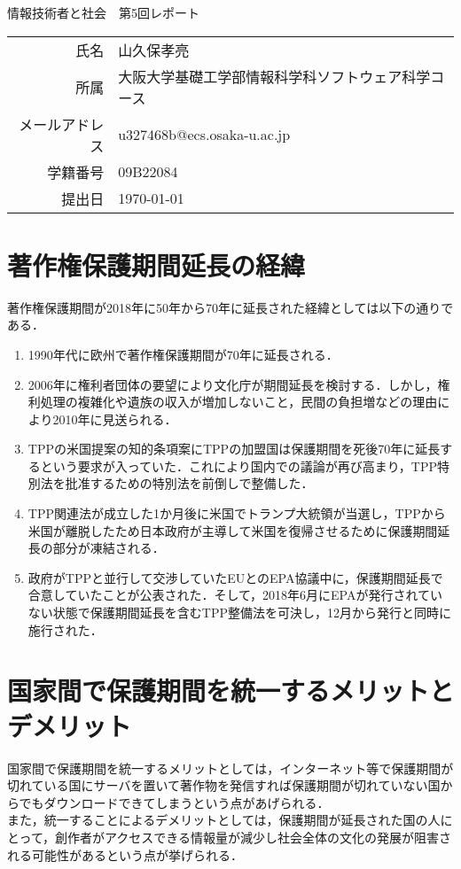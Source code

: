 \documentclass[dvipdfmx]{jarticle}
\begin{document}
\begin{titlepage}
    \begin{center}
        {\huge 情報技術者と社会　第5回レポート}
        \vspace{180pt}\\
        \begin{tabular}{rl}
            氏名 & 山久保孝亮\\
            所属 & 大阪大学基礎工学部情報科学科ソフトウェア科学コース\\
            メールアドレス & u327468b@ecs.osaka-u.ac.jp\\
            学籍番号 & 09B22084\\
            提出日 & \today\\
        \end{tabular}
    \end{center}
\end{titlepage}
\section{著作権保護期間延長の経緯}
著作権保護期間が2018年に50年から70年に延長された経緯としては以下の通りである．\cite{1}
\begin{enumerate}
    \item 1990年代に欧州で著作権保護期間が70年に延長される．
    \item 2006年に権利者団体の要望により文化庁が期間延長を検討する．しかし，権利処理の複雑化や遺族の収入が増加しないこと，民間の負担増などの理由により2010年に見送られる．
    \item TPPの米国提案の知的条項案にTPPの加盟国は保護期間を死後70年に延長するという要求が入っていた．これにより国内での議論が再び高まり，TPP特別法を批准するための特別法を前倒しで整備した．
    \item TPP関連法が成立した1か月後に米国でトランプ大統領が当選し，TPPから米国が離脱したため日本政府が主導して米国を復帰させるために保護期間延長の部分が凍結される．
    \item 政府がTPPと並行して交渉していたEUとのEPA協議中に，保護期間延長で合意していたことが公表された．そして，2018年6月にEPAが発行されていない状態で保護期間延長を含むTPP整備法を可決し，12月から発行と同時に施行された．
\end{enumerate}
\section{国家間で保護期間を統一するメリットとデメリット}
国家間で保護期間を統一するメリットとしては，インターネット等で保護期間が切れている国にサーバを置いて著作物を発信すれば保護期間が切れていない国からでもダウンロードできてしまうという点があげられる．\cite{2}
\\また，統一することによるデメリットとしては，保護期間が延長された国の人にとって，創作者がアクセスできる情報量が減少し社会全体の文化の発展が阻害される可能性があるという点が挙げられる．
\end{document}
